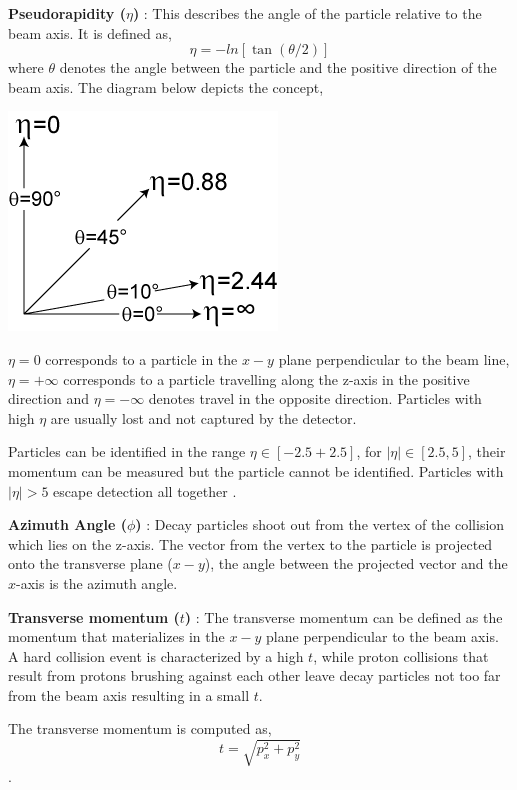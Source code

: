 \documentclass[final,3p,times,twocolumn]{elsarticle}
\begin{document}
\textbf{Pseudorapidity ($\eta$)} : This describes the angle of the particle relative to the beam axis. It is defined as, $$ \eta = -ln [\tan(\theta/2)]$$ where $\theta$ denotes the angle between the particle and the positive direction of the beam axis. The diagram below depicts the concept, 

\begin{center}
\includegraphics[scale=0.7]{Images/Pseudorapidity2.png}
\end{center}

$\eta = 0 $ corresponds to a particle in the $x-y$ plane perpendicular to the beam line, $\eta = +\infty$ corresponds to a particle travelling along the z-axis in the positive direction and $\eta = -\infty$ denotes travel in the opposite direction. Particles with high $\eta$ are usually lost and not captured by the detector. 

Particles can be identified in the range $\eta \in [-2.5 +2.5]$, for $|\eta| \in [2.5,5]$, their momentum can be measured but the particle cannot be identified. Particles with $|\eta| > 5$ escape detection all together \cite{RM}. 

\textbf{Azimuth Angle ($\phi$)} : Decay particles shoot out from the vertex of the collision which lies on the z-axis. The vector from the vertex to the particle is projected onto the transverse plane ($x-y$), the angle between the projected vector and the $x$-axis is the azimuth angle. 

\textbf{Transverse momentum  ($t$)} : The transverse momentum can be defined as the momentum that materializes in the $x-y$ plane perpendicular to the beam axis. A hard collision event is characterized by a high $t$, while proton collisions that result from protons brushing against each other leave decay particles not too far from the beam axis resulting in a small $t$. 

The transverse momentum is computed as, $$ t = \sqrt{p_{x}^2 + p_{y}^2}$$.
  
\end{document}
